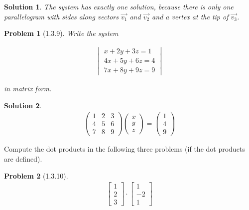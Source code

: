 \documentclass{article}
\newtheorem{problem}{Problem}
\newtheorem*{solution}{Solution}
\begin{document}
\begin{solution}
The system has exactly one solution, because there is only one parallelogram with sides along vectors $\vec{v_{1}}$ and $\vec{v_{2}}$ and a vertex at the tip of $\vec{v_{3}}$. 
\end{solution}

\begin{problem}[1.3.9]
Write the system 

\begin{align*}
\begin{vmatrix}
x + 2y + 3z = 1 \\
4x + 5y + 6z = 4 \\
7x + 8y + 9z = 9
\end{vmatrix}
\end{align*}

in matrix form.
\end{problem}

\begin{solution}
\begin{align*}
\begin{pmatrix}
1 & 2 & 3 \\
4 & 5 & 6 \\ 
7 & 8 & 9 
\end{pmatrix}
\begin{pmatrix}
x \\ y \\ z
\end{pmatrix}
=
\begin{pmatrix}
1\\ 4 \\ 9
\end{pmatrix}
\end{align*}
\end{solution}

Compute the dot products in the following three problems (if the dot products are defined).

\begin{problem}[1.3.10] 
\begin{align*}
\begin{bmatrix}
1 \\ 2 \\ 3
\end{bmatrix}
\cdot
\begin{bmatrix}
1 \\ -2 \\ 1
\end{bmatrix}
\end{align*}
\end{problem}
\end{document}

